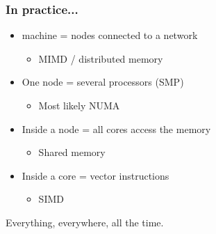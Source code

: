 \documentclass[xcolor={x11names,svgnames,psnames}]{beamer}
\begin{document}
\begin{frame}
  \frametitle{In practice...}

  \begin{itemize}
  \item machine = nodes connected to a network
    \begin{itemize}
      \item MIMD / distributed memory
    \end{itemize}
    \medskip
  \item One node = several processors (SMP)
    \begin{itemize}
    \item Most likely NUMA
    \end{itemize}
    \medskip
  \item Inside a node = all cores access the memory
    \begin{itemize}
    \item Shared memory
    \end{itemize}
    \medskip
  \item Inside a core = vector instructions
    \begin{itemize}
    \item SIMD
    \end{itemize}
  \end{itemize}

  \bigskip

  Everything, everywhere, all the time.
\end{frame}

\end{document}

